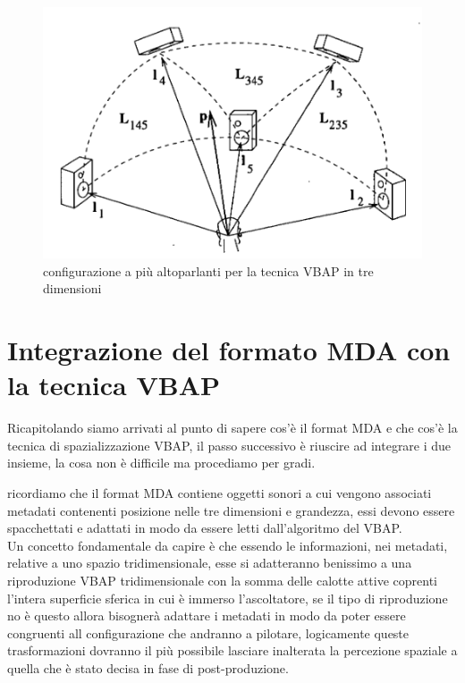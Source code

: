 \documentclass[12pt,a4paper]{report}
\begin{document}
\begin{figure}[htbp]
	\centering
	\includegraphics[scale=0.40]{figures/matrix3dfull.png}
	\caption {configurazione a più altoparlanti per la tecnica VBAP in tre dimensioni} 
	\label{fig:matrix3dfull}
	\end{figure}


\section{Integrazione del formato MDA con la tecnica VBAP}

Ricapitolando siamo arrivati al punto di sapere cos'è il format MDA e che cos'è la tecnica di spazializzazione VBAP, 
il passo successivo è riuscire ad integrare i due insieme, la cosa non è difficile ma procediamo per gradi.


ricordiamo che il format MDA contiene oggetti sonori a cui vengono associati metadati contenenti posizione nelle tre dimensioni e grandezza, essi devono essere spacchettati e adattati in modo da essere letti dall'algoritmo del VBAP.\\

Un concetto fondamentale da capire è che essendo le informazioni, nei metadati, relative a uno spazio tridimensionale, esse si adatteranno benissimo a una riproduzione VBAP tridimensionale con la somma delle calotte attive coprenti l'intera superficie sferica in cui è immerso l'ascoltatore, se il tipo di riproduzione no è questo allora bisognerà adattare i metadati in modo da poter essere congruenti all configurazione che andranno a pilotare, logicamente queste trasformazioni dovranno il più possibile lasciare inalterata la percezione spaziale a quella che è stato decisa in fase di post-produzione.\\
\end{document}
